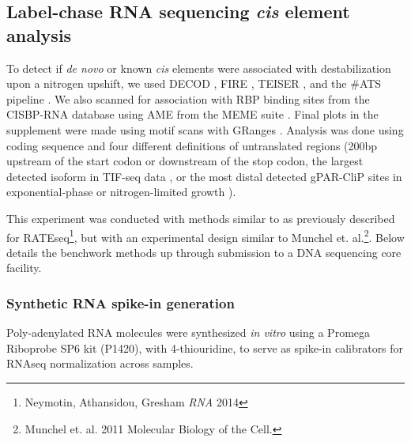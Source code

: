 {\subsection{Label-chase RNA sequencing \textit{cis} element analysis}

To detect if \textit{de novo} or known \textit{cis} elements were 
associated with destabilization upon a nitrogen upshift,
we used 
DECOD \parencite{huggins2011decod}, FIRE
\parencite{elemento2007universal},
TEISER \parencite{goodarzi2012systematic}, and the \#ATS pipeline
\parencite{li2010predicting}. 
We also scanned for association with
RBP binding sites from the CISBP-RNA database
\parencite{ray2013compendium} using AME from the MEME suite
\parencite{mcleay2010motif}. 
Final plots in the supplement were made using motif scans with 
GRanges \parencite{lawrence2013software}.
Analysis was done using coding sequence and 
four different definitions of untranslated regions 
(200bp upstream of the start codon or downstream of the stop codon, 
the largest detected isoform in TIF-seq data
\parencite{pelechano2014genome},
or the most distal detected gPAR-CliP sites in exponential-phase 
or nitrogen-limited growth \parencite{freeberg2013pervasive}).





This experiment was conducted with methods similar to as previously
described for RATEseq\footnote{Neymotin, Athansidou, Gresham \emph{RNA}
  2014}, but with an experimental design similar to Munchel et.
al.\footnote{Munchel et. al. 2011 Molecular Biology of the Cell.}. Below
details the benchwork methods up through submission to a DNA sequencing
core facility.

\subsubsection{Synthetic RNA spike-in generation}

Poly-adenylated RNA molecules were synthesized \emph{in vitro} using a
Promega Riboprobe SP6 kit (P1420), with 4-thiouridine, to serve as
spike-in calibrators for RNAseq normalization across samples.

}
